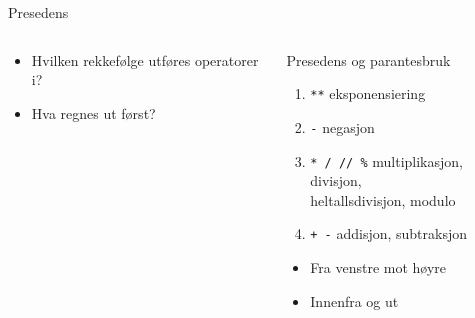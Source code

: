 \documentclass[screen, aspectratio=169]{beamer}
\begin{document}
\begin{frame}[fragile]{Presedens}
	\begin{columns}
		\begin{column}{.5\textwidth}
			\begin{itemize}
				\item Hvilken rekkefølge utføres operatorer i?
				\item Hva regnes ut først?
				\begin{itemize}
				\end{itemize}
			\end{itemize}
		\end{column}
		\begin{column}{.4\textwidth}
			\footnotesize
			\begin{block}{\small Presedens og parantesbruk}
				\begin{enumerate}
				    \item \lstinline|**| \hfill eksponensiering
					\item \lstinline|-| \hfill negasjon
					\item \lstinline|* / // %| \hfill multiplikasjon, divisjon, \\\hfill heltallsdivisjon, modulo
					\item \lstinline|+ -| \hfill addisjon, subtraksjon
				\end{enumerate}
				\begin{itemize}
					\item Fra venstre mot høyre
					\item Innenfra og ut
				\end{itemize}
			\end{block}
		\end{column}
	\end{columns}
\end{frame}
\end{document}
